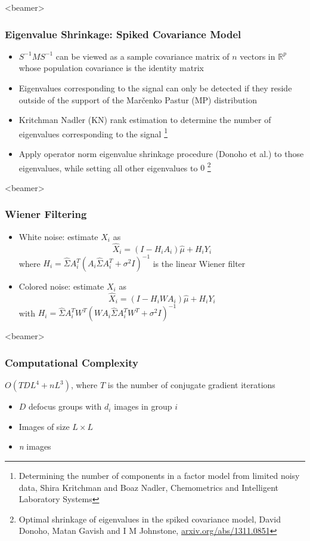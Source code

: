 \documentclass{beamer}
\begin{document}
\begin{frame}<beamer>
\frametitle{Eigenvalue Shrinkage: Spiked Covariance Model}
\begin{itemize}[<+->]
\item $S^{-1}MS^{-1}$ can be viewed as a sample covariance matrix of
$n$ vectors in $ \mathbb{R}^p$ whose population covariance is the identity matrix
\item Eigenvalues corresponding to the signal 
can only be detected if they reside outside of the support of the  Mar\v{c}enko Pastur (MP)
distribution
\item Kritchman Nadler (KN) rank estimation to determine the number of eigenvalues 
corresponding to the signal \footnote{\tiny{Determining the number of components in a factor model from limited noisy data, Shira Kritchman and Boaz Nadler,
Chemometrics and Intelligent Laboratory Systems}}
\item Apply operator norm eigenvalue 
shrinkage procedure (Donoho et al.) to those eigenvalues, while setting all other eigenvalues to 
$0$ \footnote{\tiny{Optimal shrinkage of eigenvalues in the spiked covariance model,  David Donoho, Matan Gavish and I M Johnstone,
\url{arxiv.org/abs/1311.0851}}}
\end{itemize}

\end{frame}


\begin{frame}<beamer>
\frametitle{Wiener Filtering}

\begin{itemize}
\item White noise: estimate $X_i$ as
\begin{equation}
\hat X_i = (I-H_iA_{i})\hat\mu + H_iY_i 
\end{equation}
where $H_i = \hat \Sigma A_{i}^T ( A_{i} \hat \Sigma A_{i}^T + \sigma^2 
I)^{-1} $ is the linear Wiener filter  
\item Colored noise: estimate $X_i$ as
\begin{equation}
\hat X_i = (I-H_iWA_{i})\hat\mu + H_iY_i 
\end{equation}
with $H_i = \hat \Sigma A_{i}^T W^T (W A_{i} \hat \Sigma A_{i}^T W^T 
+ \sigma^2 I)^{-1}$
\end{itemize}
\end{frame}

\begin{frame}<beamer>
\frametitle{Computational Complexity}
$O(TDL^4 + nL^3)$, where $T$ is the number of conjugate gradient iterations
\begin{itemize}
\item $D$ defocus groups with $d_i$ images in group $i$
\item Images of size $L \times L$
\item \textit{n} images
\end{itemize}
\end{frame}
\end{document}
